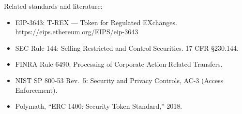 \documentclass[11pt]{article}
\begin{document}
\noindent Related standards and literature:
\begin{itemize}
  \item EIP-3643: T-REX --- Token for Regulated EXchanges. \url{https://eips.ethereum.org/EIPS/eip-3643}
  \item SEC Rule 144: Selling Restricted and Control Securities. 17 CFR \S 230.144.
  \item FINRA Rule 6490: Processing of Corporate Action-Related Transfers.
  \item NIST SP 800-53 Rev.~5: Security and Privacy Controls, AC-3 (Access Enforcement).
  \item Polymath, ``ERC-1400: Security Token Standard,'' 2018.
\end{itemize}
\end{document}

